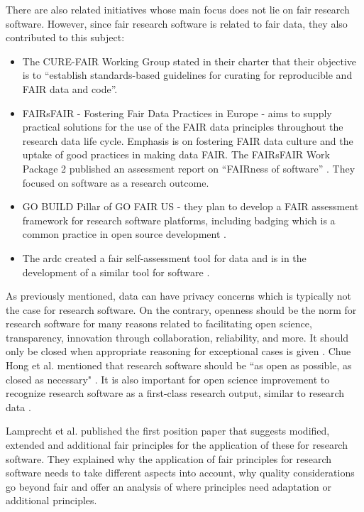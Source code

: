 There are also related initiatives whose main focus does not lie on \acrshort{fair} research software. However, since \acrshort{fair} research software is related to \acrshort{fair} data, they also contributed to this subject:
\begin{itemize}
    \item The CURE-FAIR Working Group stated in their charter \cite{cure-faircase} that their objective is to “establish standards-based guidelines for curating for reproducible and FAIR data and code”.
    \item FAIRsFAIR - Fostering Fair Data Practices in Europe - aims to supply practical solutions for the use of the FAIR data principles throughout the research data life cycle. Emphasis is on fostering FAIR data culture and the uptake of good practices in making data FAIR. The FAIRsFAIR Work Package 2 published an assessment report on “FAIRness of software” \cite{gruenpeter_m215_2020}. They focused on software as a research outcome.
    \item GO BUILD Pillar of GO FAIR US - they plan to develop a FAIR assessment framework for research software platforms, including badging which is a common practice in open source development \cite{noauthor_go_nodate}.
    \item The \acrfull{ardc} created a \acrshort{fair} self-assessment tool for data \cite{ardcfair} and is in the development of a similar tool for software \cite{ardcfairsoftware}.  
\end{itemize}

As previously mentioned, data can have privacy concerns which is typically not the case for research software. On the contrary, openness should be the norm for research software for many reasons related to facilitating open science, transparency, innovation through collaboration, reliability, and more. It should only be closed when appropriate reasoning for exceptional cases is given \cite{hasselbring_fair_2020}. Chue Hong et al. mentioned that research software should be “as open as possible, as closed as necessary" \cite{chue_hong_fair_2021}. It is also important for open science improvement to recognize research software as a first-class research output, similar to research data \cite{gruenpeter_software_2021, akhmerov_making_2019, chue_hong_making_2019, garcia_castro_software_2020}.

Lamprecht et al. \cite{lamprecht_towards_2020} published the first position paper that suggests modified, extended and additional \acrshort{fair} principles for the application of these for research software. They explained why the application of \acrshort{fair} principles for research software needs to take different aspects into account, why quality considerations go beyond \acrshort{fair} and offer an analysis of where principles need adaptation or additional principles. 

